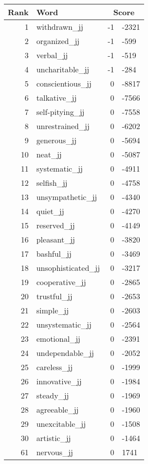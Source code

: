 \begin{longtable}[!htbp]{| rlr@{.}l |}
    \hline
    \textbf{Rank} & \textbf{Word} & \multicolumn{2}{c|}{\textbf{Score}} \\
    \hline
    \endhead
    1 & withdrawn\_jj & -1 & -2321 \\
    2 & organized\_jj & -1 & -599 \\
    3 & verbal\_jj & -1 & -519 \\
    4 & uncharitable\_jj & -1 & -284 \\
    5 & conscientious\_jj & 0 & -8817 \\
    6 & talkative\_jj & 0 & -7566 \\
    7 & self-pitying\_jj & 0 & -7558 \\
    8 & unrestrained\_jj & 0 & -6202 \\
    9 & generous\_jj & 0 & -5694 \\
    10 & neat\_jj & 0 & -5087 \\
    11 & systematic\_jj & 0 & -4911 \\
    12 & selfish\_jj & 0 & -4758 \\
    13 & unsympathetic\_jj & 0 & -4340 \\
    14 & quiet\_jj & 0 & -4270 \\
    15 & reserved\_jj & 0 & -4149 \\
    16 & pleasant\_jj & 0 & -3820 \\
    17 & bashful\_jj & 0 & -3469 \\
    18 & unsophisticated\_jj & 0 & -3217 \\
    19 & cooperative\_jj & 0 & -2865 \\
    20 & trustful\_jj & 0 & -2653 \\
    21 & simple\_jj & 0 & -2603 \\
    22 & unsystematic\_jj & 0 & -2564 \\
    23 & emotional\_jj & 0 & -2391 \\
    24 & undependable\_jj & 0 & -2052 \\
    25 & careless\_jj & 0 & -1999 \\
    26 & innovative\_jj & 0 & -1984 \\
    27 & steady\_jj & 0 & -1969 \\
    28 & agreeable\_jj & 0 & -1960 \\
    29 & unexcitable\_jj & 0 & -1508 \\
    30 & artistic\_jj & 0 & -1464 \\
    61 & nervous\_jj & 0 & 1741 \\

\end{longtable}
